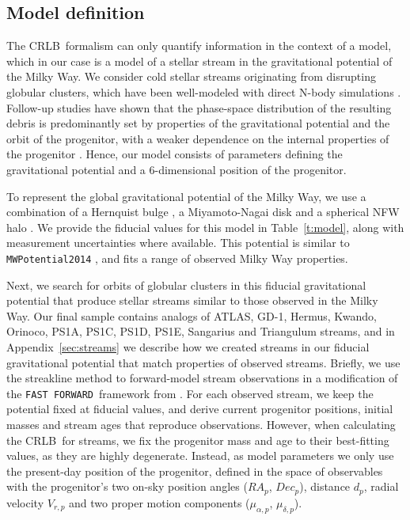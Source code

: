 \documentclass[modern]{aastex62}
\newcommand{\acronym}[1]{{\small{#1}}}
\newcommand{\CRLB}{\acronym{CRLB}}
\newcommand{\FF}{\texttt{FAST FORWARD}}
\begin{document}
\subsection{Model definition}
\label{sec:model}
The \CRLB\ formalism can only quantify information in the context of a model, which in our case is a model of a stellar stream in the gravitational potential of the Milky Way.
We consider cold stellar streams originating from disrupting globular clusters, which have been well-modeled with direct N-body simulations \citep[e.g.,][]{baumgardt2003, dehnen2004}.
Follow-up studies have shown that the phase-space distribution of the resulting debris is predominantly set by properties of the gravitational potential and the orbit of the progenitor, with a weaker dependence on the internal properties of the progenitor \citep{kupper2010, kupper2012}.
Hence, our model consists of parameters defining the gravitational potential and a 6-dimensional position of the progenitor.

To represent the global gravitational potential of the Milky Way, we use a combination of a Hernquist bulge \citep[parameterized with mass, $M_b$, and scale radius, $a_b$]{hernquist1990}, a Miyamoto-Nagai disk \citep[with parameters for disk mass, $M_d$, scale length, $a_d$, and scale height, $b_d$]{mn} and a spherical NFW halo \citep[parameterized with scale velocity, scale radius, and axis ratios $q_x=q_z=1$]{nfw}.
We provide the fiducial values for this model in Table~\ref{t:model}, along with measurement uncertainties where available.
This potential is similar to \texttt{MWPotential2014} \citep{galpy}, and fits a range of observed Milky Way properties. %

Next, we search for orbits of globular clusters in this fiducial gravitational potential that produce stellar streams similar to those observed in the Milky Way.
Our final sample contains analogs of ATLAS, GD-1, Hermus, Kwando, Orinoco, PS1A, PS1C, PS1D, PS1E, Sangarius and Triangulum streams, and in Appendix~\ref{sec:streams} we describe how we created streams in our fiducial gravitational potential that match properties of observed streams.
Briefly, we use the streakline method to forward-model stream observations in a modification of the \FF\ framework from \citet{bonaca2014}.
For each observed stream, we keep the potential fixed at fiducial values, and derive current progenitor positions, initial masses and stream ages that reproduce observations.
However, when calculating the \CRLB\ for streams, we fix the progenitor mass and age to their best-fitting values, as they are highly degenerate.
Instead, as model parameters we only use the present-day position of the progenitor, defined in the space of observables with the progenitor's two on-sky position angles ($RA_p$, $Dec_p$), distance $d_p$, radial velocity $V_{r,p}$ and two proper motion components ($\mu_{\alpha,p}$, $\mu_{\delta,p}$). 
\end{document}
